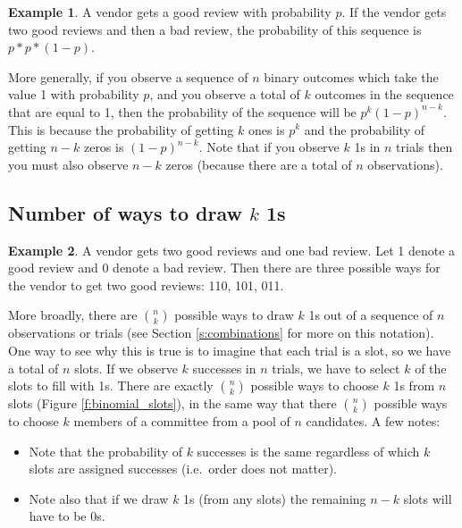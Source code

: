 \documentclass[]{article}
\theoremstyle{definition}
\newtheorem{exmp}{Example}[section]
\begin{document}
\begin{exmp}
A vendor gets a good review with probability $p$. If the vendor gets two good reviews and then a bad review, the probability of this sequence is $p * p * (1-p)$.
\end{exmp}

More generally, if you observe a sequence of $n$ binary outcomes which take the value 1 with probability $p$, and you observe a total of $k$ outcomes in the sequence that are equal to 1, then the probability of the sequence will be $p^k (1-p)^{n-k}$. This is because the probability of getting $k$ ones is $p^k$ and the probability of getting $n-k$ zeros is $(1-p)^{n-k}$. Note that if you observe $k$ 1s in $n$ trials then you must also observe $n-k$ zeros (because there are a total of $n$ observations).

 \subsection{Number of ways to draw $k$ 1s}
 
\begin{exmp}
A vendor gets two good reviews and one bad review. Let 1 denote a good review and 0 denote a bad review. Then there are three possible ways for the vendor to get two good reviews: 110, 101, 011.
\end{exmp}

\noindent More broadly, there are $n \choose k$ possible ways to draw $k$ 1s out of a sequence of $n$ observations or trials (see Section \ref{s:combinations} for more on this notation). One way to see why this is true is to imagine that each trial is a slot, so we have a total of $n$ slots. If we observe $k$ successes in $n$ trials, we have to select $k$ of the slots to fill with 1s. There are exactly $n \choose k$ possible ways to choose $k$ 1s from $n$ slots (Figure \ref{f:binomial_slots}), in the same way that there  $n \choose k$ possible ways to choose $k$ members of a committee from a pool of $n$ candidates. A few notes:
\begin{itemize}
\item Note that the probability of $k$ successes is the same regardless of which $k$ slots are assigned successes (i.e.\ order does not matter).
\item Note also that if we draw $k$ 1s (from any slots) the remaining $n-k$ slots will have to be 0s.
\end{itemize}
\end{document}
